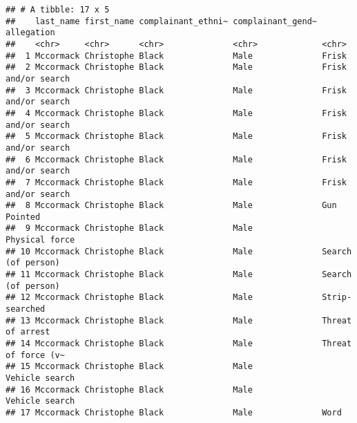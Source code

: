 \documentclass[
]{article}
\newenvironment{Shaded}{\begin{snugshade}}{\end{snugshade}}
\newcommand{\NormalTok}[1]{#1}
\begin{document}
\begin{Shaded}
\begin{Highlighting}[]
{{{{{{\NormalTok{Mccormack_allegations_Black}
\end{Highlighting}
\end{Shaded}

\begin{verbatim}
## # A tibble: 17 x 5
##    last_name first_name complainant_ethni~ complainant_gend~ allegation         
##    <chr>     <chr>      <chr>              <chr>             <chr>              
##  1 Mccormack Christophe Black              Male              Frisk              
##  2 Mccormack Christophe Black              Male              Frisk and/or search
##  3 Mccormack Christophe Black              Male              Frisk and/or search
##  4 Mccormack Christophe Black              Male              Frisk and/or search
##  5 Mccormack Christophe Black              Male              Frisk and/or search
##  6 Mccormack Christophe Black              Male              Frisk and/or search
##  7 Mccormack Christophe Black              Male              Frisk and/or search
##  8 Mccormack Christophe Black              Male              Gun Pointed        
##  9 Mccormack Christophe Black              Male              Physical force     
## 10 Mccormack Christophe Black              Male              Search (of person) 
## 11 Mccormack Christophe Black              Male              Search (of person) 
## 12 Mccormack Christophe Black              Male              Strip-searched     
## 13 Mccormack Christophe Black              Male              Threat of arrest   
## 14 Mccormack Christophe Black              Male              Threat of force (v~
## 15 Mccormack Christophe Black              Male              Vehicle search     
## 16 Mccormack Christophe Black              Male              Vehicle search     
## 17 Mccormack Christophe Black              Male              Word
\end{verbatim}
\end{document}
